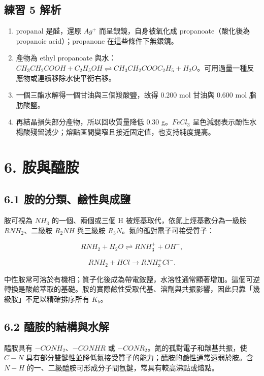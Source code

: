 \documentclass[11pt,a4paper]{article}
\newcounter{none}
\providecommand{\tightlist}{%
  \setlength{\itemsep}{0pt}\setlength{\parskip}{0pt}}
\begin{document}
\subsection{練習 5 解析}\label{ux7df4ux7fd2-5-ux89e3ux6790}

\begin{enumerate}
\def\labelenumi{\arabic{enumi}.}
\tightlist
\item
  propanal 是醛，還原 \(Ag^+\) 而呈銀鏡，自身被氧化成 propanoate（酸化後為 propanoic acid）；propanone 在這些條件下無銀鏡。
\item
  產物為 ethyl propanoate 與水：\(CH_3CH_2COOH+C_2H_5OH\rightleftharpoons CH_3CH_2COOC_2H_5+H_2O\)。可用過量一種反應物或連續移除水使平衡右移。
\item
  一個三酯水解得一個甘油與三個羧酸鹽，故得 \(0.200\) mol 甘油與 \(0.600\) mol 脂肪酸鹽。
\item
  再結晶損失部分產物，所以回收質量降低 \(0.30\) g。\(FeCl_3\) 呈色減弱表示酚性水楊酸殘留減少；熔點區間變窄且接近固定值，也支持純度提高。
\end{enumerate}

\section{6. 胺與醯胺}\label{ux80faux8207ux91afux80fa}

\subsection{6.1 胺的分類、鹼性與成鹽}\label{ux80faux7684ux5206ux985eux9e7cux6027ux8207ux6210ux9e7d}

胺可視為 \(NH_3\) 的一個、兩個或三個 H 被烴基取代，依氮上烴基數分為一級胺 \(RNH_2\)、二級胺 \(R_2NH\) 與三級胺 \(R_3N\)。氮的孤對電子可接受質子：

\[
RNH_2+H_2O\rightleftharpoons RNH_3^++OH^-,
\]

\[
RNH_2+HCl\rightarrow RNH_3^+Cl^-.
\]

中性胺常可溶於有機相；質子化後成為帶電銨鹽，水溶性通常顯著增加。這個可逆轉換是酸鹼萃取的基礎。胺的實際鹼性受取代基、溶劑與共振影響，因此只靠「幾級胺」不足以精確排序所有 \(K_b\)。

\subsection{6.2 醯胺的結構與水解}\label{ux91afux80faux7684ux7d50ux69cbux8207ux6c34ux89e3}

醯胺具有 \(-CONH_2\)、\(-CONHR\) 或 \(-CONR_2\)。氮的孤對電子和羰基共振，使 \(C-N\) 具有部分雙鍵性並降低氮接受質子的能力；醯胺的鹼性通常遠弱於胺。含 \(N-H\) 的一、二級醯胺可形成分子間氫鍵，常具有較高沸點或熔點。
\end{document}
